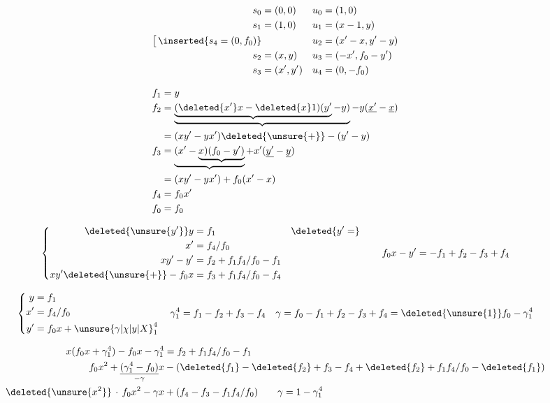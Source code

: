 \[
\begin{aligned}
s_0&=(0,0) & u_0&=(1,0)\\
s_1&=(1,0) & u_1&=(x-1,y)\\
\big[\,\inserted{s_4=(0,f_0)}& & u_2&=(x'-x,y'-y)\\
s_2&=(x,y) & u_3&=(-x',f_0-y')\\
s_3&=(x',y') & u_4&=(0,-f_0)
\end{aligned}
\]

\[
\begin{aligned}
f_1&=y\\
f_2&=\underbrace{\underbrace{(\deleted{x'}x-\deleted{x}1)(y'}-y)}-y(\underline{x'}-\underline{x})\\
&=(xy'-yx')\deleted{\unsure{+}}-(y'-y)\\
f_3&=\underbrace{(x'-\underbrace{x)(f_0-y')}}+x'(\underline{y'}-\underline{y})\\
&=(xy'-yx')+f_0(x'-x)\\
f_4&=f_0x'\\
f_0&=f_0
\end{aligned}
\]

\[
\left\{\begin{aligned}
\deleted{\unsure{y'}}y&=f_1 &&\deleted{y'=}\\
x'&=f_4/f_0\\
xy'-y'&=f_2+f_1f_4/f_0-f_1\\
xy'\deleted{\unsure{+}}-f_0x&=f_3+f_1f_4/f_0-f_4
\end{aligned}\right.
\qquad f_0x-y'=-f_1+f_2-f_3+f_4
\]

{\scriptsize
\[
\left\{\begin{aligned}
y&=f_1\\
x'&=f_4/f_0\\
y'&=f_0x+{\unsure{\gamma|\chi|y|X}}_1^4
\end{aligned}\right.
\quad \gamma_1^4=f_1-f_2+f_3-f_4
\quad \gamma=f_0-f_1+f_2-f_3+f_4=\deleted{\unsure{1}}f_0-\gamma_1^4
\]
}

\[
\begin{aligned}
x(f_0x+\gamma_1^4)-f_0x-\gamma_1^4&=f_2+f_1f_4/f_0-f_1\\
f_0x^2+\underset{-\gamma}{\underline{(\gamma_1^4-f_0)}}x
&-(\deleted{f_1}-\deleted{f_2}+f_3-f_4+\deleted{f_2}+f_1f_4/f_0-\deleted{f_1})\\
\deleted{\unsure{x^2}}\,\cdot\, f_0x^2-\gamma x&+(f_4-f_3-f_1f_4/f_0)
\qquad \gamma=1-\gamma_1^4
\end{aligned}
\]

